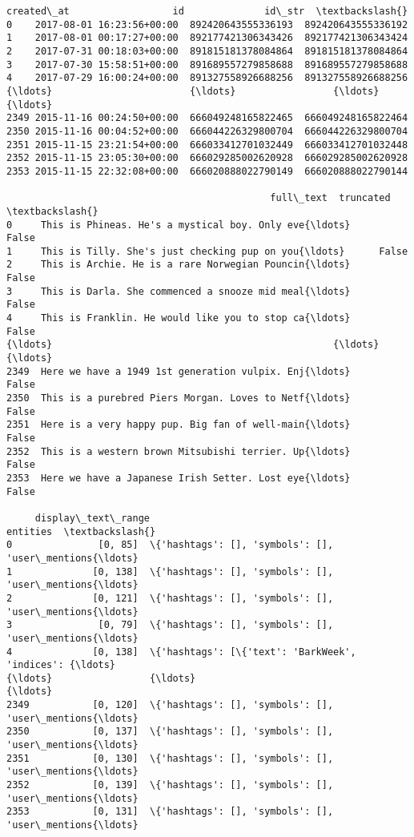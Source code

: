 \documentclass[11pt]{article}
\makeatletter
\newcommand{\boxspacing}{\kern\kvtcb@left@rule\kern\kvtcb@boxsep}
\newcommand{\prompt}[4]{
        {\ttfamily\llap{{\color{#2}[#3]:\hspace{3pt}#4}}\vspace{-\baselineskip}}
    }
\makeatother
\begin{document}
            \begin{tcolorbox}[breakable, size=fbox, boxrule=.5pt, pad at break*=1mm, opacityfill=0]
\prompt{Out}{outcolor}{30}{\boxspacing}
\begin{Verbatim}[commandchars=\\\{\}]
                    created\_at                  id              id\_str  \textbackslash{}
0    2017-08-01 16:23:56+00:00  892420643555336193  892420643555336192
1    2017-08-01 00:17:27+00:00  892177421306343426  892177421306343424
2    2017-07-31 00:18:03+00:00  891815181378084864  891815181378084864
3    2017-07-30 15:58:51+00:00  891689557279858688  891689557279858688
4    2017-07-29 16:00:24+00:00  891327558926688256  891327558926688256
{\ldots}                        {\ldots}                 {\ldots}                 {\ldots}
2349 2015-11-16 00:24:50+00:00  666049248165822465  666049248165822464
2350 2015-11-16 00:04:52+00:00  666044226329800704  666044226329800704
2351 2015-11-15 23:21:54+00:00  666033412701032449  666033412701032448
2352 2015-11-15 23:05:30+00:00  666029285002620928  666029285002620928
2353 2015-11-15 22:32:08+00:00  666020888022790149  666020888022790144

                                              full\_text  truncated  \textbackslash{}
0     This is Phineas. He's a mystical boy. Only eve{\ldots}      False
1     This is Tilly. She's just checking pup on you{\ldots}      False
2     This is Archie. He is a rare Norwegian Pouncin{\ldots}      False
3     This is Darla. She commenced a snooze mid meal{\ldots}      False
4     This is Franklin. He would like you to stop ca{\ldots}      False
{\ldots}                                                 {\ldots}        {\ldots}
2349  Here we have a 1949 1st generation vulpix. Enj{\ldots}      False
2350  This is a purebred Piers Morgan. Loves to Netf{\ldots}      False
2351  Here is a very happy pup. Big fan of well-main{\ldots}      False
2352  This is a western brown Mitsubishi terrier. Up{\ldots}      False
2353  Here we have a Japanese Irish Setter. Lost eye{\ldots}      False

     display\_text\_range                                           entities  \textbackslash{}
0               [0, 85]  \{'hashtags': [], 'symbols': [], 'user\_mentions{\ldots}
1              [0, 138]  \{'hashtags': [], 'symbols': [], 'user\_mentions{\ldots}
2              [0, 121]  \{'hashtags': [], 'symbols': [], 'user\_mentions{\ldots}
3               [0, 79]  \{'hashtags': [], 'symbols': [], 'user\_mentions{\ldots}
4              [0, 138]  \{'hashtags': [\{'text': 'BarkWeek', 'indices': {\ldots}
{\ldots}                 {\ldots}                                                {\ldots}
2349           [0, 120]  \{'hashtags': [], 'symbols': [], 'user\_mentions{\ldots}
2350           [0, 137]  \{'hashtags': [], 'symbols': [], 'user\_mentions{\ldots}
2351           [0, 130]  \{'hashtags': [], 'symbols': [], 'user\_mentions{\ldots}
2352           [0, 139]  \{'hashtags': [], 'symbols': [], 'user\_mentions{\ldots}
2353           [0, 131]  \{'hashtags': [], 'symbols': [], 'user\_mentions{\ldots}


\end{Verbatim}
\end{tcolorbox}
\end{document}

